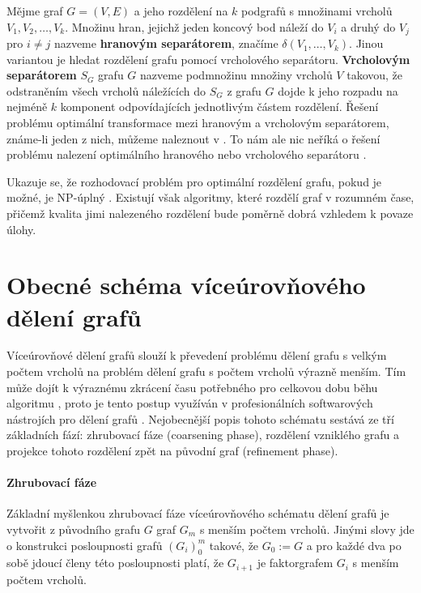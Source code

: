 \documentclass[11pt,american,czech,oneside]{book}
\theoremstyle{plain}
\theoremstyle{definition}
\begin{document}
Mějme graf $G=(V,E)$ a jeho rozdělení na $k$ podgrafů s množinami vrcholů $V_1, V_2, \ldots, V_k$. Množinu hran, jejichž jeden koncový bod náleží do $V_i$ a druhý do $V_j$ pro $i \neq j$ nazveme \textbf{hranovým separátorem}, značíme $\delta(V_1,\ldots,V_k)$. Jinou variantou je hledat rozdělení grafu pomocí vrcholového separátoru.
\textbf{Vrcholovým separátorem} $S_G$ grafu $G$ nazveme podmnožinu množiny vrcholů $V$ takovou, že odstraněním všech vrcholů náležících do $S_G$ z grafu $G$ dojde k jeho rozpadu na nejméně $k$ komponent odpovídajících jednotlivým částem rozdělení. Řešení problému optimální transformace mezi hranovým a vrcholovým separátorem, známe-li jeden z nich, můžeme naleznout v \cite{pofa:90}. To nám ale nic neříká o řešení problému nalezení optimálního hranového nebo vrcholového separátoru \cite{liu:89}.

Ukazuje se, že rozhodovací problém pro optimální rozdělení grafu, pokud je možné, je NP-úplný \cite{gajo:79}. Existují však algoritmy, které rozdělí graf v rozumném čase, přičemž kvalita jimi nalezeného rozdělení bude poměrně dobrá \cite{lita:79} vzhledem k povaze úlohy.

\section{Obecné schéma víceúrovňového dělení grafů}
\label{multilevel}

Víceúrovňové dělení grafů slouží k převedení problému dělení grafu s velkým počtem vrcholů na problém dělení grafu s počtem vrcholů výrazně menším. Tím může dojít k výraznému zkrácení času potřebného pro celkovou dobu běhu algoritmu \cite{kaku:98}, proto je tento postup využíván v profesionálních softwarových nástrojích pro dělení grafů \cite{lehe:95, hele:95}. Nejobecnější popis tohoto schématu sestává ze tří základních fází: zhrubovací fáze (coarsening phase), rozdělení vzniklého grafu a projekce tohoto rozdělení zpět na původní graf (refinement phase).

\paragraph{Zhrubovací fáze}
Základní myšlenkou zhrubovací fáze víceúrovňového schématu dělení grafů je vytvořit z původního grafu $G$ graf $G_m$ s menším počtem vrcholů. Jinými slovy jde o konstrukci posloupnosti grafů $(G_i)_0^m$ takové, že $G_0 := G$ a pro každé dva po sobě jdoucí členy této posloupnosti platí, že $G_{i+1}$ je faktorgrafem $G_i$ s menším počtem vrcholů. 
\end{document}
